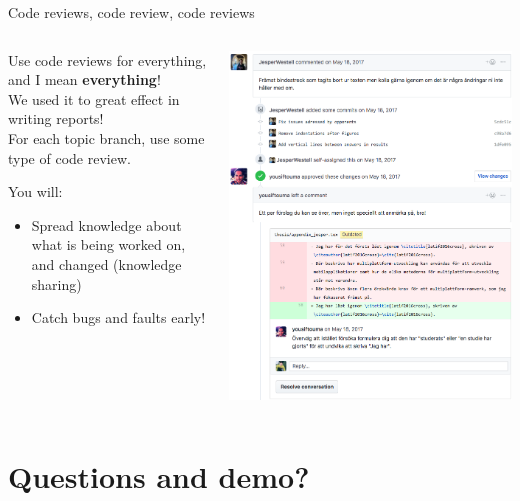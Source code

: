 \documentclass[10pt]{beamer}
\begin{document}
\begin{frame}[fragile]{Code reviews, code review, code reviews}
  \begin{columns}[T] %
     \begin{column}[T]{.5\textwidth} %
      Use code reviews for everything, and I mean \textbf{everything}!\\
      We used it to great effect in writing reports!\\
      For each topic branch, use some type of code review.

      You will:
      \begin{itemize}
        \item Spread knowledge about what is being worked on, and changed (knowledge sharing)
        \item Catch bugs and faults early!
      \end{itemize}

     \end{column}
     \begin{column}[T]{.5\textwidth} %
      \includegraphics[width=\textwidth]{pum-example}
     \end{column}
   \end{columns}

\end{frame}

\section{Questions and demo?}
\end{document}
